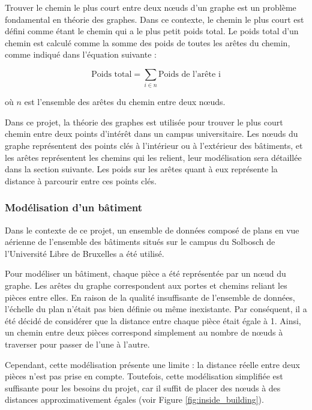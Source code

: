 \documentclass[journal, a4paper]{IEEEtran}
\begin{document}
Trouver le chemin le plus court entre deux nœuds d'un graphe est un problème fondamental en théorie des graphes. Dans ce contexte, le chemin le plus court est défini comme étant le chemin qui a le plus petit poids total. Le poids total d'un chemin est calculé comme la somme des poids de toutes les arêtes du chemin, comme indiqué dans l'équation suivante :

\begin{equation}
\text{Poids total} = \sum_{i \in n} \text{Poids de l'arête i}
\label{eq}
\end{equation}

où $n$ est l'ensemble des arêtes du chemin entre deux nœuds.

Dans ce projet, la théorie des graphes est utilisée pour trouver le plus court chemin entre deux points d'intérêt dans un campus universitaire. Les nœuds du graphe représentent des points clés à l'intérieur ou à l'extérieur des bâtiments, et les arêtes représentent les chemins qui les relient, leur modélisation sera détaillée dans la section suivante. Les poids sur les arêtes quant à eux représente la distance à parcourir entre ces points clés.
\vspace{0.5cm}

\subsubsection{Modélisation d'un bâtiment}
Dans le contexte de ce projet, un ensemble de données composé de plans en vue aérienne de l'ensemble des bâtiments situés sur le campus du Solbosch de l'Université Libre de Bruxelles a été utilisé.

Pour modéliser un bâtiment, chaque pièce a été représentée par un nœud du graphe. Les arêtes du graphe correspondent aux portes et chemins reliant les pièces entre elles. En raison de la qualité insuffisante de l'ensemble de données, l'échelle du plan n'était pas bien définie ou même inexistante. Par conséquent, il a été décidé de considérer que la distance entre chaque pièce était égale à 1. Ainsi, un chemin entre deux pièces correspond simplement au nombre de nœuds à traverser pour passer de l'une à l'autre.

Cependant, cette modélisation présente une limite : la distance réelle entre deux pièces n'est pas prise en compte. Toutefois, cette modélisation simplifiée est suffisante pour les besoins du projet, car il suffit de placer des nœuds à des distances approximativement égales (voir Figure \ref{fig:inside_building}).
\end{document}

